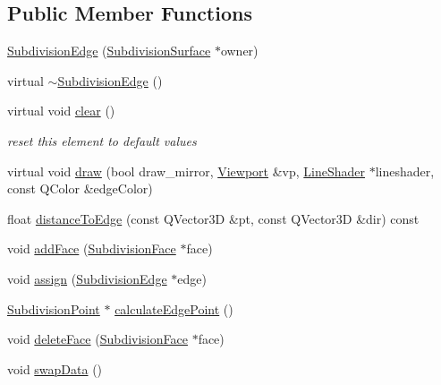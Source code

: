 \subsection*{Public Member Functions}
\begin{DoxyCompactItemize}
\item 
\hyperlink{classShipCAD_1_1SubdivisionEdge_ab08271ed7f5d371f0495d8a7d2c96dae}{Subdivision\+Edge} (\hyperlink{classShipCAD_1_1SubdivisionSurface}{Subdivision\+Surface} $\ast$owner)
\item 
virtual \hyperlink{classShipCAD_1_1SubdivisionEdge_ac787ad1a0228f91038de9518ad217364}{$\sim$\+Subdivision\+Edge} ()
\item 
virtual void \hyperlink{classShipCAD_1_1SubdivisionEdge_a08358ac65c2d710855b8b93c64ce9d02}{clear} ()
\begin{DoxyCompactList}\small\item\em reset this element to default values \end{DoxyCompactList}\item 
virtual void \hyperlink{classShipCAD_1_1SubdivisionEdge_a26deda12672fa679b49b28f2371e728b}{draw} (bool draw\+\_\+mirror, \hyperlink{classShipCAD_1_1Viewport}{Viewport} \&vp, \hyperlink{classShipCAD_1_1LineShader}{Line\+Shader} $\ast$lineshader, const Q\+Color \&edge\+Color)
\item 
float \hyperlink{classShipCAD_1_1SubdivisionEdge_a6b1e2c1ed917c6d8faf4d571446f3f7d}{distance\+To\+Edge} (const Q\+Vector3D \&pt, const Q\+Vector3D \&dir) const 
\item 
void \hyperlink{classShipCAD_1_1SubdivisionEdge_a1b2e2b1d7e051d42250c0ad1f5eaa560}{add\+Face} (\hyperlink{classShipCAD_1_1SubdivisionFace}{Subdivision\+Face} $\ast$face)
\item 
void \hyperlink{classShipCAD_1_1SubdivisionEdge_a847a6c74d35e25fdcb46ea8b7a989836}{assign} (\hyperlink{classShipCAD_1_1SubdivisionEdge}{Subdivision\+Edge} $\ast$edge)
\item 
\hyperlink{classShipCAD_1_1SubdivisionPoint}{Subdivision\+Point} $\ast$ \hyperlink{classShipCAD_1_1SubdivisionEdge_aa1bce1c13f4911839205e812cfd0f683}{calculate\+Edge\+Point} ()
\item 
void \hyperlink{classShipCAD_1_1SubdivisionEdge_a1f4b70ab6d0c4dfec07a2d4348bc9a3e}{delete\+Face} (\hyperlink{classShipCAD_1_1SubdivisionFace}{Subdivision\+Face} $\ast$face)
\item 
void \hyperlink{classShipCAD_1_1SubdivisionEdge_ad19ddea08367fa2307e131132e36c008}{swap\+Data} ()
\item 

\end{DoxyCompactItemize}
